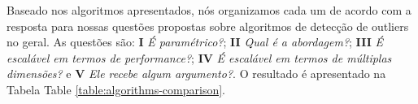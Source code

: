 \vspace{25pt}


Baseado nos algoritmos apresentados, nós organizamos cada um de acordo com a resposta para nossas questões propostas sobre algoritmos de detecção de outliers no geral. As questões são: \textbf{I} \textit{É paramétrico?}; \textbf{II} \textit{Qual é a abordagem?}; \textbf{III} \textit{É escalável em termos de performance?}; \textbf{IV} \textit{É escalável em termos de múltiplas dimensões?} e \textbf{V} \textit{Ele recebe algum argumento?}. O resultado é apresentado na Tabela Table \ref{table:algorithms-comparison}.

